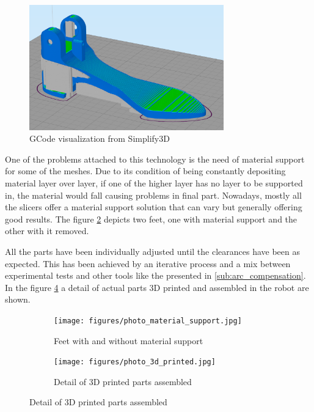 \begin{figure}[htb]
  \centering
  \includegraphics[width=0.75\textwidth]{figures/3d_printing_gcode}
  \caption{GCode visualization from Simplify3D \cite{simplify3d}}
  \label{fig:3d_printing_gcode}
\end{figure}

One of the problems attached to this technology is the need of material support for some of the meshes.
Due to its condition of being constantly depositing material layer over layer, if one of the higher layer has no layer to be supported in, the material would fall causing problems in final part.
Nowadays, mostly all the slicers offer a material support solution that can vary but generally offering good results.
The figure \ref{fig:photo_material_support} depicts two feet, one with material support and the other with it removed.

All the parts have been individually adjusted until the clearances have been as expected.
This has been achieved by an iterative process and a mix between experimental tests and other tools like the presented in \ref{sub:arc_compensation}.
In the figure \ref{fig:photo_3d_printed} a detail of actual parts 3D printed and assembled in the robot are shown.

\begin{figure}[ht]
    \centering
    \begin{subfigure}[b]{0.49\textwidth}
        \texttt{[image: figures/photo\_material\_support.jpg]}
        \caption{Feet with and without material support}
        \label{fig:photo_material_support}
    \end{subfigure}
    \begin{subfigure}[b]{0.49\textwidth}
        \texttt{[image: figures/photo\_3d\_printed.jpg]}
        \caption{Detail of 3D printed parts assembled}
        \label{fig:photo_3d_printed}
    \end{subfigure}
\end{figure}

